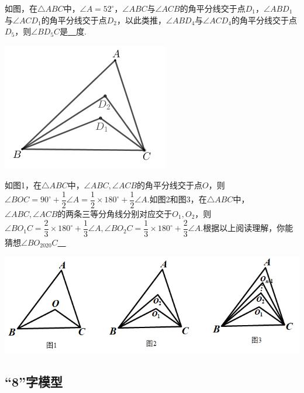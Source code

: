 \begin{example}
如图，在$\triangle ABC$中，$\angle A=52^\circ$，$\angle ABC$与$\angle ACB$的角平分线交于点$D_1$，$\angle ABD_1$与$\angle ACD_1$的角平分线交于点$D_2$，以此类推，$\angle ABD_4$与$\angle ACD_4$的角平分线交于点$D_5$，则$\angle BD_5C$是\underline{~\hspace{1cm}~}度.
\end{example}

 \includegraphics[scale=0.6]{figure/feibiao07.PNG}

\begin{example}
如图1，在$\triangle ABC$中，$\angle ABC,\angle ACB$的角平分线交于点$O$，则$\angle BOC=90^\circ+\dfrac{1}{2}\angle A=\dfrac{1}{2}\times 180^\circ+\dfrac{1}{2}\angle A$.如图2和图3，在$\triangle ABC$中，$\angle ABC,\angle ACB$的两条三等分角线分别对应交于$O_1,O_2$，则$\angle BO_1C=\dfrac{2}{3}\times 180^\circ+\dfrac{1}{3}\angle A,\angle BO_2C=\dfrac{1}{3}\times 180^\circ+\dfrac{2}{3}\angle A$.根据以上阅读理解，你能猜想$\angle BO_{2020}C$\underline{~\hspace{1cm}~}
\end{example}

 \includegraphics[scale=0.6]{figure/feibiao08.PNG}


\subsection{“8”字模型}

